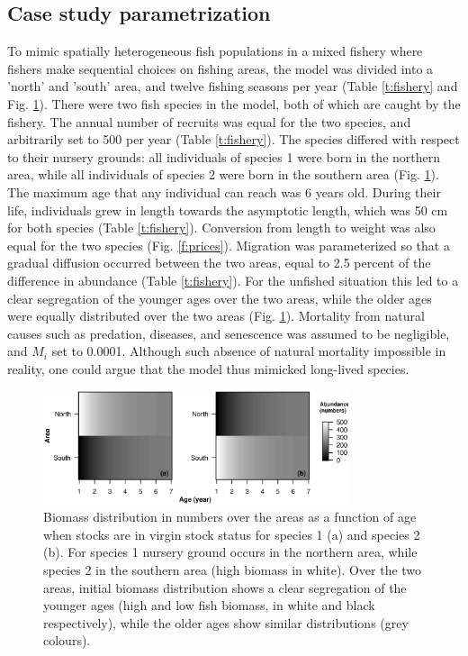 \documentclass[12pt,oneline,a4paper,numbib]{ouparticle}
\numberwithin{equation}{subsection} %
\begin{document}
\subsection{Case study parametrization}

To mimic spatially heterogeneous fish populations in a mixed fishery where fishers make sequential choices on fishing areas, the model was divided into a 'north' and 'south' area, and twelve fishing seasons per year (Table \ref{t:fishery} and Fig. \ref{f:distribution}). There were two fish species in the model, both of which are caught by the fishery. The annual number of recruits was equal for the two species, and arbitrarily set to 500 per year (Table \ref{t:fishery}). The species differed with respect to their nursery grounds: all individuals of species 1 were born in the northern area, while all individuals of species 2 were born in the southern area (Fig. \ref{f:distribution}). The maximum age that any individual can reach was 6 years old. During their life, individuals grew in length towards the asymptotic length, which was 50 cm for both species (Table \ref{t:fishery}). Conversion from length to weight was also equal for the two species (Fig. \ref{f:prices}). Migration was parameterized so that a gradual diffusion occurred between the two areas, equal to 2.5 percent of the difference in abundance (Table \ref{t:fishery}). For the unfished situation this led to a clear segregation of the younger ages over the two areas, while the older ages were equally distributed over the two areas (Fig. \ref{f:distribution}). Mortality from natural causes such as predation, diseases, and senescence was assumed to be negligible, and $M_i$ set to 0.0001. Although such absence of natural mortality impossible in reality, one could argue that the model thus mimicked long-lived species.

\begin{figure}[!ht]
\centering
\includegraphics[width=0.8\textwidth]{Figures/Distributions.eps} 
\caption{Biomass distribution in numbers over the areas as a function of age when stocks are in virgin stock status for species 1 (a) and species 2 (b). For species 1 nursery ground occurs in the northern area, while species 2 in the southern area (high biomass in white). Over the two areas, initial biomass distribution shows a clear segregation of the younger ages (high and low fish biomass, in white and black respectively), while the older ages show similar distributions (grey colours).}
\label{f:distribution}
\end{figure}
\end{document}
